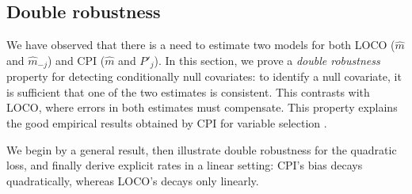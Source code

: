 \documentclass{article}
\theoremstyle{plain}
\theoremstyle{definition}
\newtheorem{assumption}[theorem]{Assumption}
\theoremstyle{remark}
\newcommand{\indep}{\perp\!\!\!\perp}
\begin{document}
\subsection{Double robustness}\label{subsec:double-robust}
We have observed that there is a need to estimate two models for both LOCO ($\widehat{m}$ and $\widehat{m}_{-j}$) and CPI ($\widehat{m}$ and $P'_{j}$). 
In this section, we prove a \emph{double robustness} property for detecting conditionally null covariates: to identify a null covariate, it is sufficient that one of the two estimates is consistent. This contrasts with LOCO, where errors in both estimates must compensate.  This property explains the good empirical results obtained by CPI for variable selection \cite{chamma2024statistically,chamma2024variable, paillard2025measuringvariableimportanceheterogeneous}.



We begin by a general result, then illustrate double robustness for the quadratic loss, and finally derive explicit rates in a linear setting: CPI's bias decays quadratically, whereas LOCO's decays only linearly.




\end{document}
